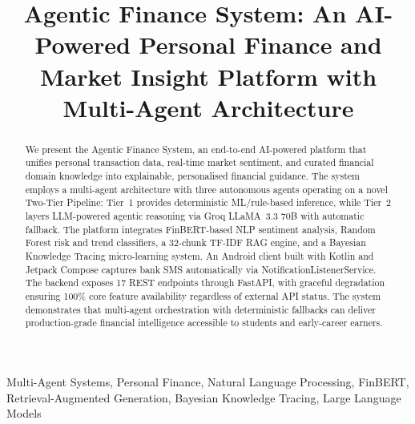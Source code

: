 \documentclass[conference]{IEEEtran}
\begin{document}
\title{Agentic Finance System: An AI-Powered Personal Finance and Market Insight Platform with Multi-Agent Architecture}

\author{
\and
{}
\and
{}
\and
{}
\and
{}
}

\maketitle

\begin{abstract}
We present the Agentic Finance System, an end-to-end AI-powered platform that unifies personal transaction data, real-time market sentiment, and curated financial domain knowledge into explainable, personalised financial guidance. The system employs a multi-agent architecture with three autonomous agents operating on a novel Two-Tier Pipeline: Tier~1 provides deterministic ML/rule-based inference, while Tier~2 layers LLM-powered agentic reasoning via Groq LLaMA~3.3 70B with automatic fallback. The platform integrates FinBERT-based NLP sentiment analysis, Random Forest risk and trend classifiers, a 32-chunk TF-IDF RAG engine, and a Bayesian Knowledge Tracing micro-learning system. An Android client built with Kotlin and Jetpack Compose captures bank SMS automatically via NotificationListenerService. The backend exposes 17 REST endpoints through FastAPI, with graceful degradation ensuring 100\% core feature availability regardless of external API status. The system demonstrates that multi-agent orchestration with deterministic fallbacks can deliver production-grade financial intelligence accessible to students and early-career earners.
\end{abstract}

\begin{IEEEkeywords}
Multi-Agent Systems, Personal Finance, Natural Language Processing, FinBERT, Retrieval-Augmented Generation, Bayesian Knowledge Tracing, Large Language Models
\end{IEEEkeywords}

\end{document}
